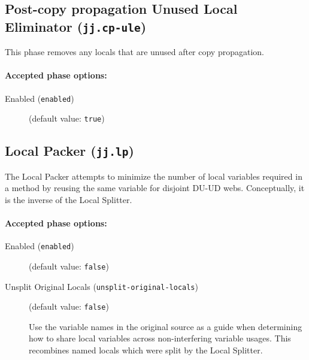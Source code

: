 \documentclass{article}
\begin{document}
\subsection{Post-copy propagation Unused Local Eliminator ({\tt jj.cp-ule})}

This phase removes any locals that are unused after copy propagation.


\paragraph{Accepted phase options:} 

\begin{description}

\item[Enabled ({\tt enabled})]
(default value: {\tt true})






\end{description}

\subsection{Local Packer ({\tt jj.lp})}

The Local Packer attempts to minimize the number of local
variables required in a method by reusing the same variable for
disjoint DU-UD webs. Conceptually, it is the inverse of the
Local Splitter.


\paragraph{Accepted phase options:} 

\begin{description}

\item[Enabled ({\tt enabled})]
(default value: {\tt false})






\item[Unsplit Original Locals ({\tt unsplit-original-locals})]
(default value: {\tt false})




Use the variable names in the original source as a guide when
determining how to share local variables across non-interfering
variable usages. This recombines named locals which were split by
the Local Splitter. 



\end{description}
\end{document}
